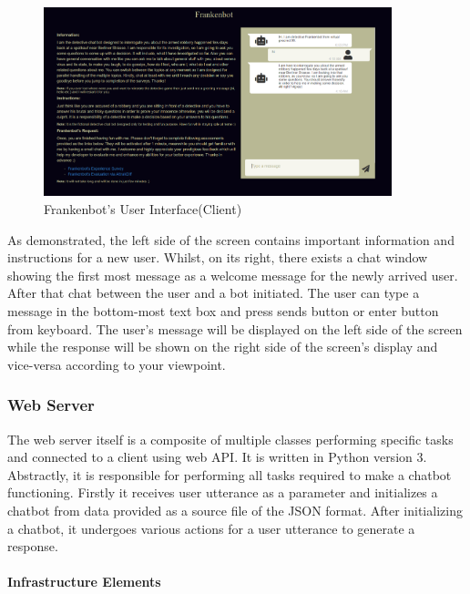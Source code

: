 \begin{figure}[!h]
    \centering
    \includegraphics[width=0.9\textwidth]{img/User_Interface.PNG}
    \caption{Frankenbot's User Interface(Client)}
    \label{fig:userInter}
\end{figure}
\noindent
As demonstrated, the left side of the screen contains important information and instructions for a new user. Whilst, on its right, there exists a chat window showing the first most message as a welcome message for the newly arrived user. After that chat between the user and a bot initiated. The user can type a message in the bottom-most text box and press sends button or enter button from keyboard. The user's message will be displayed on the left side of the screen while the response will be shown on the right side of the screen's display and vice-versa according to your viewpoint.

\subsubsection*{Web Server}
The web server itself is a composite of multiple classes performing specific tasks and connected to a client using web API. It is written in Python version 3. Abstractly, it is responsible for performing all tasks required to make a chatbot functioning. Firstly it receives user utterance as a parameter and initializes a chatbot from data provided as a source file of the JSON format. After initializing a chatbot, it undergoes various actions for a user utterance to generate a response.

\paragraph*{Infrastructure Elements}

